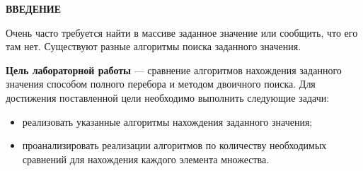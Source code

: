 \begin{center}
    \textbf{ВВЕДЕНИЕ}
\end{center}

Очень часто требуется найти в массиве заданное значение или сообщить, что его там нет.
Существуют разные алгоритмы поиска заданного значения.

\textbf{Цель лабораторной работы} --- сравнение алгоритмов нахождения заданного значения
способом полного перебора и методом двоичного поиска.
Для достижения поставленной цели необходимо выполнить следующие задачи:

\begin{itemize}
	\item реализовать указанные алгоритмы нахождения заданного значения;
        \item проанализировать реализации алгоритмов по количеству необходимых
            сравнений для нахождения каждого элемента множества.
\end{itemize}
